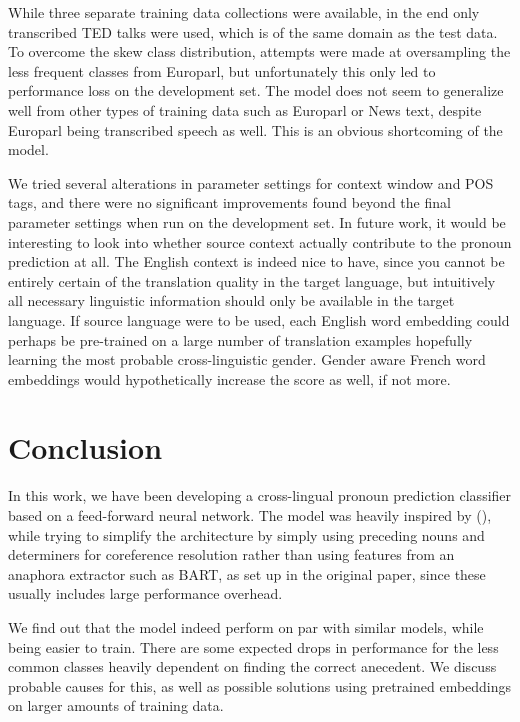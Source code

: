 \documentclass[11pt]{article}
\begin{document}
While three separate training data collections were available, in the end only transcribed TED talks were used, which is of the same domain as the test data.
To overcome the skew class distribution, attempts were made at oversampling the less frequent classes from Europarl, but unfortunately this only led to performance loss on the development set.
The model does not seem to generalize well from other types of training data such as Europarl or News text, despite Europarl being transcribed speech as well.
This is an obvious shortcoming of the model.

We tried several alterations in parameter settings for context window and POS tags, and there were no significant improvements found beyond the final parameter settings when run on the development set.
In future work, it would be interesting to look into whether source context actually contribute to the pronoun prediction at all.
The English context is indeed nice to have, since you cannot be entirely certain of the translation quality in the target language, but intuitively all necessary linguistic information should only be available in the target language.
If source language were to be used, each English word embedding could perhaps be pre-trained on a large number of translation examples hopefully learning the most probable cross-linguistic gender.
Gender aware French word embeddings would hypothetically increase the score as well, if not more.

\section{Conclusion}

In this work, we have been developing a cross-lingual pronoun prediction classifier based on a feed-forward neural network.
The model was heavily inspired by (\cite{Hardmeier2013Latent}), while trying to simplify the architecture by simply using preceding nouns and determiners for coreference resolution rather than using features from an anaphora extractor such as BART, as set up in the original paper, since these usually includes large performance overhead.

We find out that the model indeed perform on par with similar models, while being easier to train.
There are some expected drops in performance for the less common classes heavily dependent on finding the correct anecedent.
We discuss probable causes for this, as well as possible solutions using pretrained embeddings on larger amounts of training data.

\printbibliography
\end{document}
